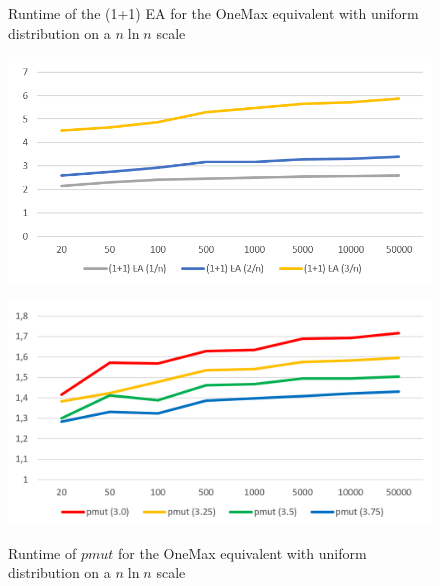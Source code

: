 \begin{figure}[h]
      \centering
      \begin{minipage}[b]{0.45\textwidth}
            \caption{Runtime of the (1+1) EA for the OneMax equivalent with uniform distribution on a $n\ln n$ scale}
            \includegraphics[width=\textwidth]{figures/images/oneMaxUniformMultipleN_EACompareNlnn.png}\label{fig:onemaxuniformEA}
      \end{minipage}
      \hspace{0.75cm}
      \begin{minipage}[b]{0.45\textwidth}
            \caption{Runtime of $pmut$ for the OneMax equivalent with uniform distribution on a $n\ln n$ scale}
            \includegraphics[width=\textwidth]{figures/images/oneMaxUniformMultipleN_pmutCompare.png}\label{fig:onemaxniformPmut}
      \end{minipage}
\end{figure}